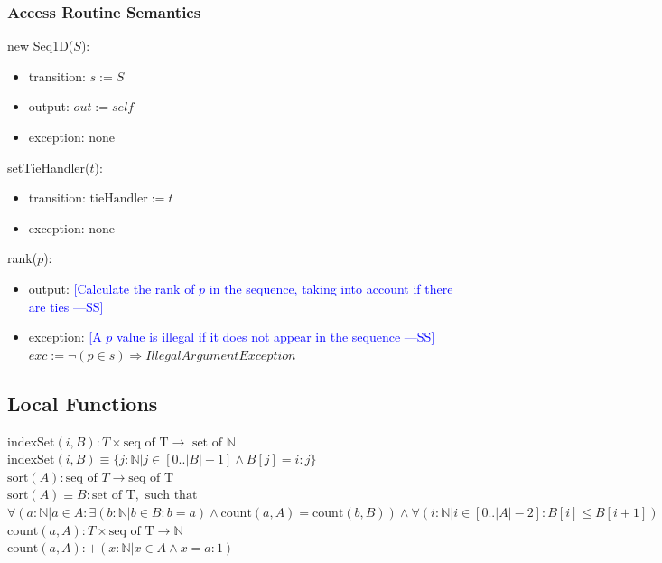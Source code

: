 \documentclass[12pt,fleqn]{examtst}
\newcommand{\authornote}[3]{\textcolor{#1}{[#3 ---#2]}}
\newcommand{\authornote}[3]{}
\newcommand{\wss}[1]{\authornote{blue}{SS}{#1}}
\begin{document}
\subsubsection* {Access Routine Semantics}

new Seq1D($S$):
\begin{itemize}
\item transition: $s := S$
\item output: $\mathit{out} := \mathit{self}$
\item exception: none
\end{itemize}

\noindent setTieHandler($t$):
\begin{itemize}
\item transition: $\mbox{tieHandler} := t$
\item exception: none
\end{itemize}

\noindent rank($p$):
\begin{itemize}
\item output: \wss{Calculate the rank of $p$ in the sequence, taking into
    account if there are ties}
\item exception: \wss{A $p$ value is illegal if it does not appear in the
    sequence} \\
    $exc := \lnot (p \in s) \Rightarrow IllegalArgumentException$
\end{itemize}

\subsection*{Local Functions}

\noindent $\mbox{indexSet}(i, B): T \times \mbox{seq of T}  \rightarrow \mbox{ set of }
\mathbb{N}$\\
\noindent $\mbox{indexSet}(i, B) \equiv \{j: \mathbb{N} | j \in [0..|B|-1]
\wedge B[j] = i : j \}$\\

\noindent $\mbox{sort}(A): \mbox{seq of } T \rightarrow \mbox{seq of T}$\\
\noindent $\mbox{sort}(A) \equiv B: \mbox{set of T}, \mbox{ such that }$\\
\noindent
$\forall (a: \mathbb{N} | a \in A : \exists(b: \mathbb{N} | b \in B: b = a)
\wedge \mbox{count}(a, A) = \mbox{count}(b, B)) \wedge \forall (i: \mathbb{N} |
i \in [0..|A|-2] : B[i] \leq B[i+1])$\\

\noindent $\mbox{count}(a, A): T \times \mbox{seq of T} \rightarrow \mathbb{N}$\\
\noindent $\mbox{count}(a, A): + (x: \mathbb{N} | x \in A \wedge x = a : 1)$\\
\end{document}
